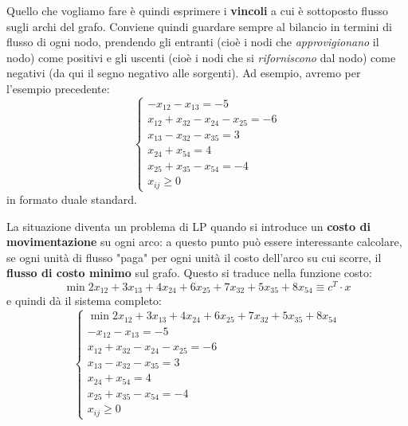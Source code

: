 \documentclass[a4paper,11pt]{article}
\begin{document}
Quello che vogliamo fare è quindi esprimere i \textbf{vincoli} a cui è sottoposto flusso sugli archi del grafo.
Conviene quindi guardare sempre al bilancio in termini di flusso di ogni nodo, prendendo gli entranti (cioè i nodi che \textit{approvigionano} il nodo) come positivi e gli uscenti (cioè i nodi che si \textit{riforniscono} dal nodo) come negativi (da qui il segno negativo alle sorgenti).
Ad esempio, avremo per l'esempio precedente:
\[
	\begin{cases}
		-x_{12} - x_{13} = -5 \\ 
		x_{12} + x_{32} - x_{24} - x_{25} = -6 \\ 
		x_{13} - x_{32} - x_{35} = 3 \\ 
		x_{24} + x_{54} = 4 \\ 
		x_{25 }+ x_{35} - x_{54} = -4 \\ 
		x_{ij} \geq 0
	\end{cases}
\]
in formato duale standard.

La situazione diventa un problema di LP quando si introduce un \textbf{costo di movimentazione} su ogni arco: a questo punto può essere interessante calcolare, se ogni unità di flusso "paga" per ogni unità il costo dell'arco su cui scorre, il \textbf{flusso di costo minimo} sul grafo.
Questo si traduce nella funzione costo:
$$
\min{2 x_{12} + 3 x_{13} + 4 x_{24} + 6 x_{25} + 7 x_{32} + 5 x_{35} + 8 x_{54} \equiv c^T \cdot x}
$$
e quindi dà il sistema completo:
\[
	\begin{cases}
		\min{2 x_{12} + 3 x_{13} + 4 x_{24} + 6 x_{25} + 7 x_{32} + 5 x_{35} + 8 x_{54}} \\ 
		-x_{12} - x_{13} = -5 \\ 
		x_{12} + x_{32} - x_{24} - x_{25} = -6 \\ 
		x_{13} - x_{32} - x_{35} = 3 \\ 
		x_{24} + x_{54} = 4 \\ 
		x_{25 }+ x_{35} - x_{54} = -4 \\ 
		x_{ij} \geq 0
	\end{cases}
\]
\end{document}
